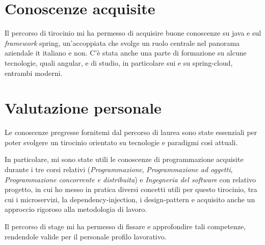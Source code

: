 \section{Conoscenze acquisite}

Il percorso di tirocinio mi ha permesso di acquisire buone conoscenze su \gls{java} e sul \textit{framework} \gls{spring}, un'accoppiata che svolge un ruolo centrale nel panorama aziendale \gls{it} italiano e non.
C'è stata anche una parte di formazione su alcune tecnologie, quali \gls{angular}, e di studio, in particolare sui  e su \gls{spring-cloud}, entrambi moderni.

\section{Valutazione personale}

Le conoscenze pregresse fornitemi dal percorso di laurea sono state essenziali per poter svolgere un tirocinio orientato su tecnologie e paradigmi così attuali.

In particolare, mi sono state utili le conoscenze di programmazione acquisite durante i tre corsi relativi (\textit{Programmazione}, \textit{Programmazione ad oggetti}, \textit{Programmazione concorrente e distribuita}) e \textit{Ingegneria del software} con relativo progetto, in cui ho messo in pratica diversi concetti utili per questo tirocinio, tra cui i microservizi, la \gls{dependency-injection},  i \gls{design-pattern} e acquisito anche un approccio rigoroso alla metodologia di lavoro.

Il percorso di stage mi ha permesso di fissare e approfondire tali competenze, rendendole valide per il personale profilo
lavorativo.

